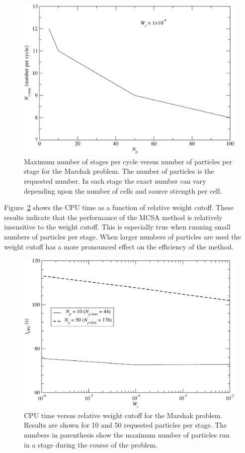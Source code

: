 \documentclass[preprint,12pt]{elsarticle}
\begin{document}
\begin{figure}[h!]
  \centerline{ \includegraphics[width=5in,clip]{mrshk_np_Ns.pdf}}
  \caption{ Maximum number of stages per cycle versus number of
    particles per stage for the Marshak problem.  The number of
    particles is the requested number.  In each stage the exact number
    can vary depending upon the number of cells and source strength
    per cell.}
  \label{fig:CPU_Ns}
\end{figure}

Figure~\ref{fig:CPU_wc} shows the CPU time as a function of relative weight
cutoff.  These results indicate that the performance of the MCSA method is
relatively insensitive to the weight cutoff.  This is especially true when
running small numbers of particles per stage.  When larger numbers of
particles are used the weight cutoff has a more pronounced effect on the
efficiency of the method.
\begin{figure}[h!]
  \centerline{ \includegraphics[width=5in,clip]{mrshk_wc_CPU.pdf}}
  \caption{ CPU time versus relative weight cutoff for the Marshak
    problem.  Results are shown for 10 and 50 requested particles per
    stage.  The numbers in parenthesis show the maximum number of
    particles run in a stage during the course of the problem.}
  \label{fig:CPU_wc}
\end{figure}
\end{document}
